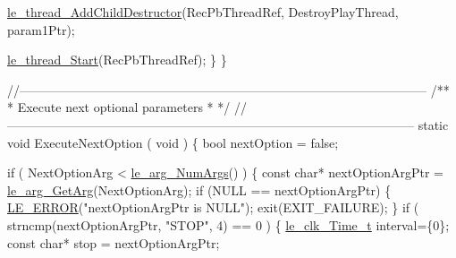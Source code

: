 \begin{DoxyCodeInclude}
{{{{{{{{{        \hyperlink{le__thread_8h_a671dbe2927a3b2a13c5150476398f34f}{le\_thread\_AddChildDestructor}(RecPbThreadRef,
                                    DestroyPlayThread,
                                    param1Ptr);

        \hyperlink{le__thread_8h_a38df3877ee5ab9fac17b2fc0be46c27e}{le\_thread\_Start}(RecPbThreadRef);
    \}
\}

\textcolor{comment}{//--------------------------------------------------------------------------------------------------}\textcolor{comment}{}
\textcolor{comment}{/**}
\textcolor{comment}{ * Execute next optional parameters}
\textcolor{comment}{ *}
\textcolor{comment}{ */}
\textcolor{comment}{//--------------------------------------------------------------------------------------------------}
\textcolor{keyword}{static} \textcolor{keywordtype}{void} ExecuteNextOption
(
    \textcolor{keywordtype}{void}
)
\{
    \textcolor{keywordtype}{bool} nextOption = \textcolor{keyword}{false};

    \textcolor{keywordflow}{if} ( NextOptionArg < \hyperlink{le__args_8h_a6fbbeb423104e6eb92fe47ef42b7310a}{le\_arg\_NumArgs}() )
    \{
        \textcolor{keyword}{const} \textcolor{keywordtype}{char}* nextOptionArgPtr = \hyperlink{le__args_8h_a5ebca8229facd069785639cb3c1e273a}{le\_arg\_GetArg}(NextOptionArg);
        \textcolor{keywordflow}{if} (NULL == nextOptionArgPtr)
        \{
            \hyperlink{le__log_8h_a353590f91b3143a7ba3a416ae5a50c3d}{LE\_ERROR}(\textcolor{stringliteral}{"nextOptionArgPtr is NULL"});
            exit(EXIT\_FAILURE);
        \}
        \textcolor{keywordflow}{if} ( strncmp(nextOptionArgPtr, \textcolor{stringliteral}{"STOP"}, 4) == 0 )
        \{
            \hyperlink{structle__clk___time__t}{le\_clk\_Time\_t} interval=\{0\};
            \textcolor{keyword}{const} \textcolor{keywordtype}{char}* stop = nextOptionArgPtr;

}}}}}}}}}
\end{DoxyCodeInclude}
